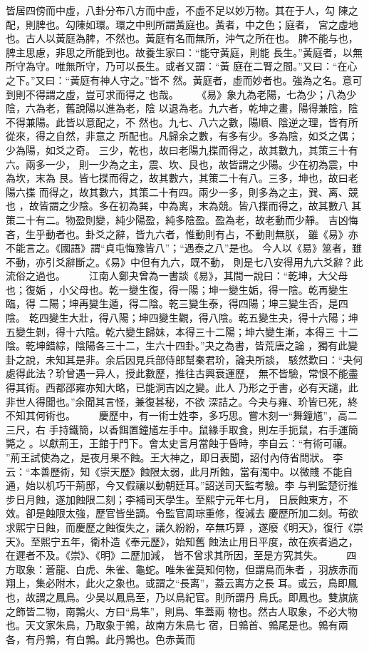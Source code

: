 \documentclass{ctexart}
\begin{document}
皆居四傍而中虛，八卦分布八方而中虛，不虛不足以妙万物。其在于人，勾 陳之配，則脾也。勾陳如環。環之中則所謂黃庭也。黃者，中之色；庭者， 宮之虛地也。古人以黃庭為脾，不然也。黃庭有名而無所，沖气之所在也。 脾不能与也，脾主思慮，非思之所能到也。故養生家曰：``能守黃庭，則能 長生。''黃庭者，以無所守為守。唯無所守，乃可以長生。或者又謂：``黃 庭在二腎之間。''又曰：``在心之下。''又曰：``黃庭有神人守之。''皆不 然。黃庭者，虛而妙者也。強為之名。意可到則不得謂之虛，豈可求而得之 也哉。 　　《易》象九為老陽，七為少；八為少陰，六為老，舊說陽以進為老，陰 以退為老。九六者，乾坤之畫，陽得兼陰，陰不得兼陽。此皆以意配之，不 然也。九七、八六之數，陽順、陰逆之理，皆有所從來，得之自然，非意之 所配也。凡歸余之數，有多有少。多為陰，如爻之偶；少為陽，如爻之奇。 三少，乾也，故曰老陽九揲而得之，故其數九，其策三十有六。兩多一少， 則一少為之主，震、坎、艮也，故皆謂之少陽。少在初為震，中為坎，末為 艮。皆七揲而得之，故其數六，其策二十有八。三多，坤也，故曰老陽六揲 而得之，故其數六，其策二十有四。兩少一多，則多為之主，巽、离、競也 ，故皆謂之少陰。多在初為巽，中為离，末為競。皆八揲而得之，故其數八 其策二十有二。物盈則變，純少陽盈，純多陰盈。盈為老，故老動而少靜。 吉凶悔吝，生乎動者也。卦爻之辭，皆九六者，惟動則有占，不動則無朕， 雖《易》亦不能言之。《國語》謂``貞屯悔豫皆八''；``遇泰之八''是也。 今人以《易》筮者，雖不動，亦引爻辭斷之。《易》中但有九六，既不動， 則是七八安得用九六爻辭？此流俗之過也。 　　江南人鄭夬曾為一書談《易》，其間一說曰：``乾坤，大父母也；復姤 ，小父母也。乾一變生復，得一陽；坤一變生姤，得一陰。乾再變生臨，得 二陽；坤再變生遁，得二陰。乾三變生泰，得四陽；坤三變生否，是四陰。 乾四變生大壯，得八陽；坤四變生觀，得八陰。乾五變生夬，得十六陽；坤 五變生剝，得十六陰。乾六變生歸妹，本得三十二陽；坤六變生漸，本得三 十二陰。乾坤錯綜，陰陽各三十二，生六十四卦。''夬之為書，皆荒唐之論 ，獨有此變卦之說，未知其是非。余后因見兵部侍郎幫秦君玠，論夬所談， 駭然歎曰：``夬何處得此法？玠曾遇一异人，授此數歷，推往古興衰運歷， 無不皆驗，常恨不能盡得其術。西都邵雍亦知大略，已能洞吉凶之變。此人 乃形之于書，必有天譴，此非世人得聞也。''余聞其言怪，兼復甚秘，不欲 深詰之。今夬与雍、玠皆已死，終不知其何術也。 　　慶歷中，有一術士姓李，多巧思。嘗木刻一``舞鐘馗''，高二三尺，右 手持鐵簡，以香餌置鐘馗左手中。鼠緣手取食，則左手扼鼠，右手運簡斃之 。以獻荊王，王館于門下。會太史言月當蝕于昏時，李自云：``有術可禳。 ''荊王試使為之，是夜月果不蝕。王大神之，即日表聞，詔付內侍省問狀。 李云：``本善歷術，知《崇天歷》蝕限太弱，此月所蝕，當有濁中。以微賤 不能自通，始以机巧干荊邸，今又假禳以動朝廷耳。''詔送司天監考驗。李 与判監楚衍推步日月蝕，遂加蝕限二刻；李補司天學生。至熙宁元年七月， 日辰蝕東方，不效。卻是蝕限太強，歷官皆坐謫。令監官周琮重修，復減去 慶歷所加二刻。苟欲求熙宁日蝕，而慶歷之蝕復失之，議久紛紛，卒無巧算 ，遂廢《明天》，復行《崇天》。至熙宁五年，衛朴造《奉元歷》，始知舊 蝕法止用日平度，故在疾者過之，在遲者不及。《崇》、《明》二歷加減， 皆不曾求其所因，至是方究其失。 　　四方取象：蒼龍、白虎、朱雀、龜蛇。唯朱雀莫知何物，但謂鳥而朱者 ，羽族赤而翔上，集必附木，此火之象也。或謂之``長离''，蓋云离方之長 耳。或云，鳥即鳳也，故謂之鳳鳥。少昊以鳳鳥至，乃以鳥紀官。則所謂丹 鳥氏。即鳳也。雙旗旐之飾皆二物，南鶉火、方曰``鳥隼''，則鳥、隼蓋兩 物也。然古人取象，不必大物也。天文家朱鳥，乃取象于鶉，故南方朱鳥七 宿，日鶉首、鶉尾是也。鶉有兩各，有丹鶉，有白鶉。此丹鶉也。色赤黃而 
\end{document}
